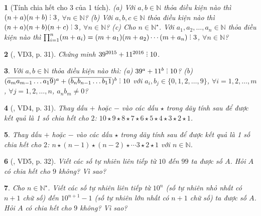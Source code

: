 \documentclass{article}
\newtheorem{baitoan}{}
\DeclareRobustCommand{\divby}{%
	\mathrel{\vbox{\baselineskip.65ex\lineskiplimit0pt\hbox{.}\hbox{.}\hbox{.}}}%
}
\begin{document}
\begin{baitoan}[Tính chia hết cho 3 của 1 tích]
	(a) Với $a,b\in\mathbb{N}$ thỏa điều kiện nào thì $(n + a)(n + b)\divby3$, $\forall n\in\mathbb{N}$? (b) Với $a,b,c\in\mathbb{N}$ thỏa điều kiện nào thì $(n + a)(n + b)(n + c)\divby3$, $\forall n\in\mathbb{N}$? (c) Cho $n\in\mathbb{N}^\star$. Với $a_1,a_2,\ldots,a_n\in\mathbb{N}$ thỏa điều kiện nào thì $\prod_{i=1}^n (m + a_i) = (m + a_1)(m + a_2)\cdots(m + a_n)\divby3$, $\forall n\in\mathbb{N}$?
\end{baitoan}

\begin{baitoan}[\cite{Binh_boi_duong_Toan_6_tap_1}, VD3, p. 31]
	Chứng minh $39^{2015} + 11^{2016}\divby10$.
\end{baitoan}

\begin{baitoan}
	Với $a,b\in\mathbb{N}$ thỏa điều kiện nào thì: (a) $39^a + 11^b\divby10$? (b) $(\overline{a_ma_{m-1}\ldots a_19})^a + (\overline{b_nb_{n-1}\ldots b_11})^b\divby10$ với $a_i,b_j\in\{0,1,2,\ldots,9\}$, $\forall i = 1,2,\ldots,m$, $\forall j = 1,2,\ldots,n$, $a_nb_m\ne0$?
\end{baitoan}

\begin{baitoan}[\cite{Binh_boi_duong_Toan_6_tap_1}, VD4, p. 31]
	Thay dấu $+$ hoặc $-$ vào các dấu $\star$ trong dãy tính sau để được kết quả là 1 số chia hết cho $2$: $10\star9\star8\star7\star6\star5\star4\star3\star2\star1$.
\end{baitoan}

\begin{baitoan}
	Thay dấu $+$ hoặc $-$ vào các dấu $\star$ trong dãy tính sau để được kết quả là 1 số chia hết cho $2$: $n\star(n - 1)\star(n - 2)\star\cdots3\star2\star1$ với $n\in\mathbb{N}$.
\end{baitoan}

\begin{baitoan}[\cite{Binh_boi_duong_Toan_6_tap_1}, VD5, p. 32]
	Viết các số tự nhiên liên tiếp từ $10$ đến $99$ ta được số $A$. Hỏi $A$ có chia hết cho $9$ không? Vì sao?
\end{baitoan}

\begin{baitoan}
	Cho $n\in\mathbb{N}^\star$. Viết các số tự nhiên liên tiếp từ $10^n$ (số tự nhiên nhỏ nhất có $n + 1$ chữ số) đến $10^{n+1} - 1$ (số tự nhiên lớn nhất có $n + 1$ chữ số) ta được số $A$. Hỏi $A$ có chia hết cho $9$ không? Vì sao?
\end{baitoan}
\end{document}
